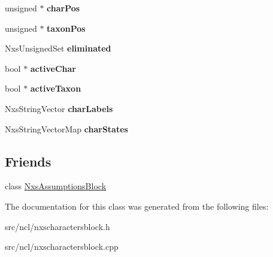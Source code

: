 \begin{DoxyCompactItemize}
\item 
\hypertarget{classNxsCharactersBlock_afaf75137ef3e389566bf3334964998c8}{
unsigned $\ast$ {\bfseries charPos}}
\label{classNxsCharactersBlock_afaf75137ef3e389566bf3334964998c8}

\item 
\hypertarget{classNxsCharactersBlock_a0428a316fae8eeb8af293370ce604598}{
unsigned $\ast$ {\bfseries taxonPos}}
\label{classNxsCharactersBlock_a0428a316fae8eeb8af293370ce604598}

\item 
\hypertarget{classNxsCharactersBlock_a37dbaacd79e577d99901dbc01834a012}{
NxsUnsignedSet {\bfseries eliminated}}
\label{classNxsCharactersBlock_a37dbaacd79e577d99901dbc01834a012}

\item 
\hypertarget{classNxsCharactersBlock_a73590a6876462d6a897e7ab2a0177a62}{
bool $\ast$ {\bfseries activeChar}}
\label{classNxsCharactersBlock_a73590a6876462d6a897e7ab2a0177a62}

\item 
\hypertarget{classNxsCharactersBlock_a0dbee8381f8575b0436f61b032e12ffe}{
bool $\ast$ {\bfseries activeTaxon}}
\label{classNxsCharactersBlock_a0dbee8381f8575b0436f61b032e12ffe}

\item 
\hypertarget{classNxsCharactersBlock_a3f9e1f582590b4fe7ca35bc1fd5d96c7}{
NxsStringVector {\bfseries charLabels}}
\label{classNxsCharactersBlock_a3f9e1f582590b4fe7ca35bc1fd5d96c7}

\item 
\hypertarget{classNxsCharactersBlock_a6e73be6a91ea04e9b220d79de72f1f49}{
NxsStringVectorMap {\bfseries charStates}}
\label{classNxsCharactersBlock_a6e73be6a91ea04e9b220d79de72f1f49}

\end{DoxyCompactItemize}
\subsection*{Friends}
\begin{DoxyCompactItemize}
\item 
\hypertarget{classNxsCharactersBlock_a97ede2c71acd1e6aa5521164f8eaba1e}{
class \hyperlink{classNxsCharactersBlock_a97ede2c71acd1e6aa5521164f8eaba1e}{NxsAssumptionsBlock}}
\label{classNxsCharactersBlock_a97ede2c71acd1e6aa5521164f8eaba1e}

\end{DoxyCompactItemize}


The documentation for this class was generated from the following files:\begin{DoxyCompactItemize}
\item 
src/ncl/nxscharactersblock.h\item 
src/ncl/nxscharactersblock.cpp\end{DoxyCompactItemize}
